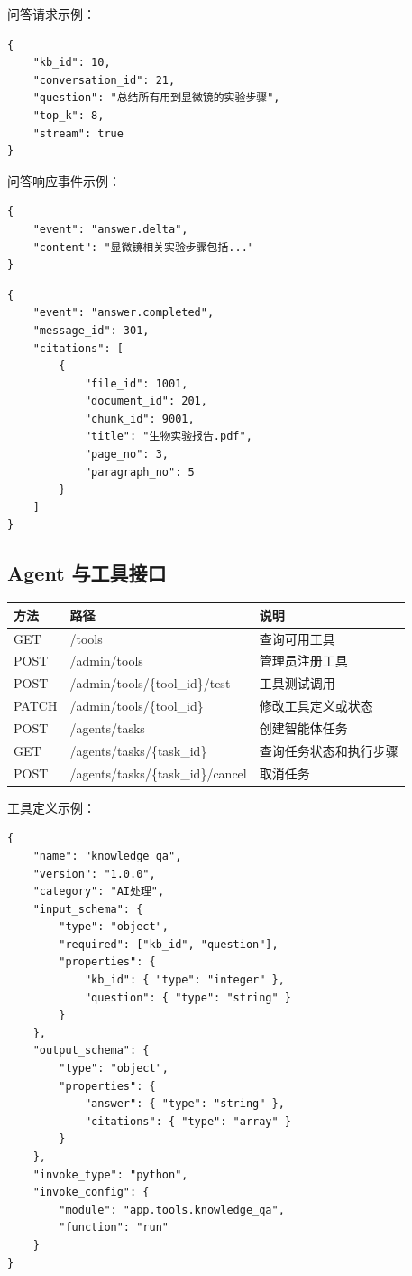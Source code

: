 \documentclass[a4paper,zihao=-4]{ctexart}
\begin{document}
问答请求示例：

\begin{lstlisting}
{
    "kb_id": 10,
    "conversation_id": 21,
    "question": "总结所有用到显微镜的实验步骤",
    "top_k": 8,
    "stream": true
}
\end{lstlisting}

问答响应事件示例：

\begin{lstlisting}
{
    "event": "answer.delta",
    "content": "显微镜相关实验步骤包括..."
}
\end{lstlisting}

\begin{lstlisting}
{
    "event": "answer.completed",
    "message_id": 301,
    "citations": [
        {
            "file_id": 1001,
            "document_id": 201,
            "chunk_id": 9001,
            "title": "生物实验报告.pdf",
            "page_no": 3,
            "paragraph_no": 5
        }
    ]
}
\end{lstlisting}

\hypertarget{agent-ux4e0eux5de5ux5177ux63a5ux53e3}{%
\subsection{Agent
与工具接口}\label{agent-ux4e0eux5de5ux5177ux63a5ux53e3}}

\begin{longtable}{|>{\raggedright\arraybackslash}p{2.4cm}|>{\raggedright\arraybackslash}p{\dimexpr(\linewidth-2.4cm-6\tabcolsep-4\arrayrulewidth)/2\relax}|>{\raggedright\arraybackslash}p{\dimexpr(\linewidth-2.4cm-6\tabcolsep-4\arrayrulewidth)/2\relax}|}
\hline
方法 & 路径 & 说明\tabularnewline
\hline
\endhead
GET & /tools & 查询可用工具\tabularnewline
\hline
POST & /admin/tools & 管理员注册工具\tabularnewline
\hline
POST & /admin/tools/\{tool\_id\}/test & 工具测试调用\tabularnewline
\hline
PATCH & /admin/tools/\{tool\_id\} & 修改工具定义或状态\tabularnewline
\hline
POST & /agents/tasks & 创建智能体任务\tabularnewline
\hline
GET & /agents/tasks/\{task\_id\} & 查询任务状态和执行步骤\tabularnewline
\hline
POST & /agents/tasks/\{task\_id\}/cancel & 取消任务\tabularnewline
\hline
\end{longtable}

工具定义示例：

\begin{lstlisting}
{
    "name": "knowledge_qa",
    "version": "1.0.0",
    "category": "AI处理",
    "input_schema": {
        "type": "object",
        "required": ["kb_id", "question"],
        "properties": {
            "kb_id": { "type": "integer" },
            "question": { "type": "string" }
        }
    },
    "output_schema": {
        "type": "object",
        "properties": {
            "answer": { "type": "string" },
            "citations": { "type": "array" }
        }
    },
    "invoke_type": "python",
    "invoke_config": {
        "module": "app.tools.knowledge_qa",
        "function": "run"
    }
}
\end{lstlisting}
\end{document}
